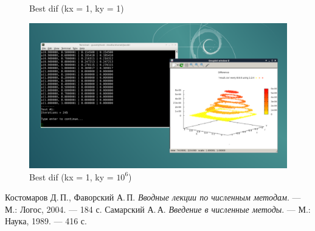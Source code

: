 \documentclass[a4paper, fleqn]{report}
\begin{document}
\begin{figure}[h]
\begin{minipage}{0.49\textwidth}
        \caption{Best dif (kx = 1, ky = 1)}
        \label{fig:best_dif_1_1}
    \end{minipage}%
    \begin{minipage}{0.49\textwidth}
        \centering
        \includegraphics[width=\textwidth]{media/best_dif_1_1000000.png}
        \caption{Best dif (kx = 1, ky = $10^6$)}
        \label{fig:best_dif_1_1000000}
    \end{minipage}
\end{figure}


\begin{thebibliography}{2}
\renewcommand{\bibname}{Литература}
Костомаров Д.\,П., Фаворский А.\,П. \textit{Вводные лекции по численным методам}. — М.: Логос, 2004. — 184 с.
Самарский А.\,А. \textit{Введение в численные методы}. — М.: Наука, 1989. — 416 с.
\end{thebibliography}
\end{document}
